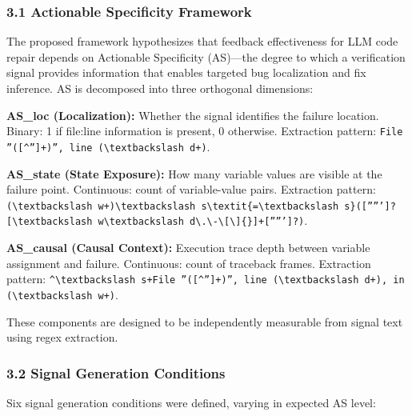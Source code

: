 
\subsubsection{3.1 Actionable Specificity Framework}

The proposed framework hypothesizes that feedback effectiveness for LLM code repair depends on Actionable Specificity (AS)---the degree to which a verification signal provides information that enables targeted bug localization and fix inference. AS is decomposed into three orthogonal dimensions:

\textbf{AS\_loc (Localization):} Whether the signal identifies the failure location. Binary: 1 if file:line information is present, 0 otherwise. Extraction pattern: \texttt{File ''([\^{}'']+)'', line (\textbackslash textbackslash d+)}.

\textbf{AS\_state (State Exposure):} How many variable values are visible at the failure point. Continuous: count of variable-value pairs. Extraction pattern: \texttt{(\textbackslash textbackslash w+)\textbackslash textbackslash s\textbackslash textit\{=\textbackslash textbackslash s\}([''''']?[\textbackslash textbackslash w\textbackslash textbackslash d\textbackslash .\textbackslash -\textbackslash [\textbackslash ]\{\}]+[''''']?)}.

\textbf{AS\_causal (Causal Context):} Execution trace depth between variable assignment and failure. Continuous: count of traceback frames. Extraction pattern: \texttt{\^{}\textbackslash textbackslash s+File ''([\^{}'']+)'', line (\textbackslash textbackslash d+), in (\textbackslash textbackslash w+)}.

These components are designed to be independently measurable from signal text using regex extraction.

\subsubsection{3.2 Signal Generation Conditions}

Six signal generation conditions were defined, varying in expected AS level:

\begin{table}[htbp]
\centering
{}
\end{table}


